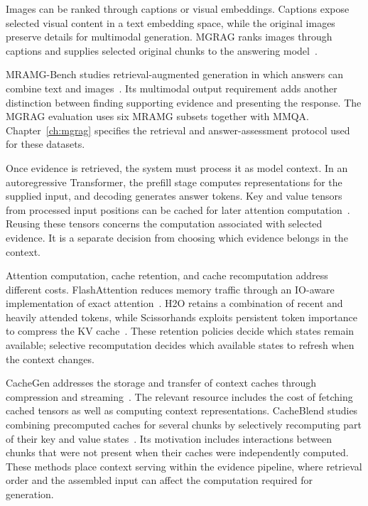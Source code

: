 Images can be ranked through captions or visual embeddings. Captions expose selected visual content in a text embedding space, while the original images preserve details for multimodal generation. MGRAG ranks images through captions and supplies selected original chunks to the answering model~\cite{bg-mgrag}.

MRAMG-Bench studies retrieval-augmented generation in which answers can combine text and images~\cite{bg-mramg}. Its multimodal output requirement adds another distinction between finding supporting evidence and presenting the response. The MGRAG evaluation uses six MRAMG subsets together with MMQA. Chapter~\ref{ch:mgrag} specifies the retrieval and answer-assessment protocol used for these datasets.

Once evidence is retrieved, the system must process it as model context. In an autoregressive Transformer, the prefill stage computes representations for the supplied input, and decoding generates answer tokens. Key and value tensors from processed input positions can be cached for later attention computation~\cite{bg-transformer,bg-cacheblend}. Reusing these tensors concerns the computation associated with selected evidence. It is a separate decision from choosing which evidence belongs in the context.

Attention computation, cache retention, and cache recomputation address different costs. FlashAttention reduces memory traffic through an IO-aware implementation of exact attention~\cite{lit-dao2022flashattention}. H2O retains a combination of recent and heavily attended tokens, while Scissorhands exploits persistent token importance to compress the KV cache~\cite{lit-zhang2023h2o,lit-liu2023scissorhands}. These retention policies decide which states remain available; selective recomputation decides which available states to refresh when the context changes.

CacheGen addresses the storage and transfer of context caches through compression and streaming~\cite{bg-cachegen}. The relevant resource includes the cost of fetching cached tensors as well as computing context representations. CacheBlend studies combining precomputed caches for several chunks by selectively recomputing part of their key and value states~\cite{bg-cacheblend}. Its motivation includes interactions between chunks that were not present when their caches were independently computed. These methods place context serving within the evidence pipeline, where retrieval order and the assembled input can affect the computation required for generation.


